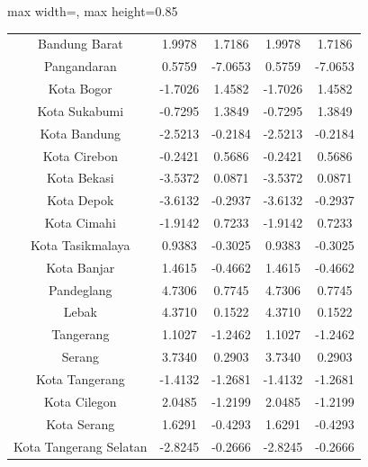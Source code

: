 \begin{table}[H]
\begin{adjustbox}{max width=\textwidth, max height=0.85\textheight}
\begin{tabular}{|c|c|c|c|c|}
Bandung Barat & 1.9978 & 1.7186 & 1.9978 & 1.7186 \\
Pangandaran & 0.5759 & -7.0653 & 0.5759 & -7.0653 \\
Kota Bogor & -1.7026 & 1.4582 & -1.7026 & 1.4582 \\
Kota Sukabumi & -0.7295 & 1.3849 & -0.7295 & 1.3849 \\
Kota Bandung & -2.5213 & -0.2184 & -2.5213 & -0.2184 \\
Kota Cirebon & -0.2421 & 0.5686 & -0.2421 & 0.5686 \\
Kota Bekasi & -3.5372 & 0.0871 & -3.5372 & 0.0871 \\
Kota Depok & -3.6132 & -0.2937 & -3.6132 & -0.2937 \\
Kota Cimahi & -1.9142 & 0.7233 & -1.9142 & 0.7233 \\
Kota Tasikmalaya & 0.9383 & -0.3025 & 0.9383 & -0.3025 \\
Kota Banjar & 1.4615 & -0.4662 & 1.4615 & -0.4662 \\
Pandeglang & 4.7306 & 0.7745 & 4.7306 & 0.7745 \\
Lebak & 4.3710 & 0.1522 & 4.3710 & 0.1522 \\
Tangerang & 1.1027 & -1.2462 & 1.1027 & -1.2462 \\
Serang & 3.7340 & 0.2903 & 3.7340 & 0.2903 \\
Kota Tangerang & -1.4132 & -1.2681 & -1.4132 & -1.2681 \\
Kota Cilegon & 2.0485 & -1.2199 & 2.0485 & -1.2199 \\
Kota Serang & 1.6291 & -0.4293 & 1.6291 & -0.4293 \\
Kota Tangerang Selatan & -2.8245 & -0.2666 & -2.8245 & -0.2666 \\
\hline
\end{tabular}
\end{adjustbox}
\end{table}